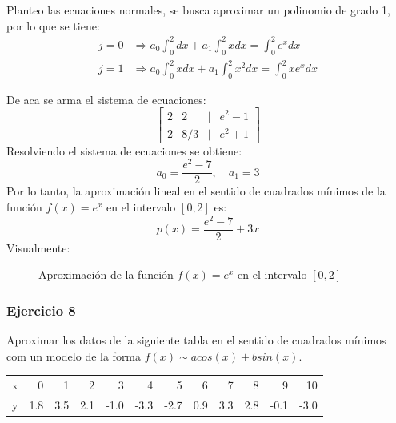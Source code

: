 \documentclass{article}
\begin{document}
Planteo las ecuaciones normales, se busca aproximar un polinomio de grado 1, por lo que se tiene:
\begin{align}
    j = 0 &\Rightarrow a_0 \int_{0}^{2} dx + a_1 \int_{0}^{2} x dx = \int_{0}^{2} e^x dx \\
    j = 1 &\Rightarrow a_0 \int_{0}^{2} x dx + a_1 \int_{0}^{2} x^2 dx = \int_{0}^{2} x e^x dx
\end{align}

De aca se arma el sistema de ecuaciones:
\begin{equation}
    \begin{bmatrix}
        2 & 2 & | & e^2 - 1 \\
        2 & 8/3 & | & e^2 + 1
    \end{bmatrix}
\end{equation}
Resolviendo el sistema de ecuaciones se obtiene:
\begin{equation}
    a_0 = \frac{e^2 - 7}{2}, \quad a_1 = 3
\end{equation}
Por lo tanto, la aproximación lineal en el sentido de cuadrados mínimos de la función \( f(x) = e^x \) en el intervalo \([0,2]\) es:
\begin{equation}
    p(x) = \frac{e^2 - 7}{2} + 3x
\end{equation}
\newpage
Visualmente:
\begin{figure}[h]
    \centering
    \caption{Aproximación de la función \( f(x) = e^x \) en el intervalo \([0,2]\)}
    \label{fig:myplot11}
\end{figure}

\subsubsection{Ejercicio 8}
Aproximar los datos de la siguiente tabla en el sentido de cuadrados mínimos com un modelo de la forma $f(x) \sim a cos(x) + b sin(x)$.
\begin{center}
    \begin{tabular}{||r||r|r|r|r|r|r|r|r|r|r|r||}
    \hline
    x & 0 & 1 & 2 & 3 & 4 & 5 & 6 & 7 & 8 & 9 & 10 \\
    y & 1.8 & 3.5 & 2.1 & -1.0 & -3.3 & -2.7 & 0.9 & 3.3 & 2.8 & -0.1 & -3.0 \\
    \hline
    \end{tabular}
\end{center}
\end{document}
